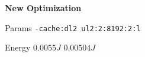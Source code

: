 
        \begin{tcolorbox}[width=\linewidth, colback=white!95!black, colframe=white!95!black]
            \begin{center}\textbf{New Optimization}\end{center}

            \tcblower
            
            Params \hfill \verb|-cache:dl2 ul2:2:8192:2:l|

            Energy \hfill \st{$0.0055J$} $0.00504J$

        \end{tcolorbox}
    